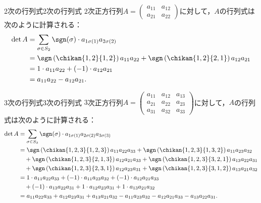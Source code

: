\begin{example}{2次の行列式}{2次の行列式}
  $2$次正方行列$A = \begin{pmatrix} a_{11} & a_{12} \\ a_{21} & a_{22} \end{pmatrix}$に対して，$A$の行列式は次のように計算される：
  \begin{align*}
    \det A &= \sum_{\sigma \in S_2} \sgn(\sigma) \cdot a_{1\sigma(1)} a_{2\sigma(2)} \\
    &= \sgn\left( \chikan{1, 2}{1, 2} \right) a_{11} a_{22} + \sgn\left( \chikan{1, 2}{2, 1} \right) a_{12} a_{21} \\
    &= 1 \cdot a_{11} a_{22} + (-1) \cdot a_{12} a_{21} \\
    &= a_{11} a_{22} - a_{12} a_{21}.
  \end{align*}
\end{example}

\begin{example}{3次の行列式}{3次の行列式}
  $3$次正方行列$A = \begin{pmatrix} a_{11} & a_{12} & a_{13} \\ a_{21} & a_{22} & a_{23} \\ a_{31} & a_{32} & a_{33} \end{pmatrix}$に対して，$A$の行列式は次のように計算される：
  \begin{align*}
    \det A &= \sum_{\sigma \in S_3} \sgn(\sigma) \cdot  a_{1\sigma(1)} a_{2\sigma(2)} a_{3\sigma(3)} \\
    &= \sgn\left( \chikan{1, 2, 3}{1, 2, 3} \right) a_{11} a_{22} a_{33} + \sgn\left( \chikan{1, 2, 3}{1, 3, 2} \right) a_{11} a_{23} a_{32} \\
    &\quad + \sgn\left( \chikan{1, 2, 3}{2, 1, 3} \right) a_{12} a_{21} a_{33} + \sgn\left( \chikan{1, 2, 3}{3, 2, 1} \right) a_{13} a_{22} a_{31} \\
    &\quad + \sgn\left( \chikan{1, 2, 3}{2, 3, 1} \right) a_{12} a_{23} a_{31} + \sgn\left( \chikan{1, 2, 3}{3, 1, 2} \right) a_{13} a_{21} a_{32} \\
    &= 1 \cdot a_{11} a_{22} a_{33} + (-1) \cdot a_{11} a_{23} a_{32} + (-1) \cdot a_{12} a_{21} a_{33} \\
    &\quad + (-1) \cdot a_{13} a_{22} a_{31} + 1 \cdot a_{12} a_{23} a_{31} + 1 \cdot a_{13} a_{21} a_{32} \\
    &= a_{11} a_{22} a_{33} + a_{12} a_{23} a_{31} + a_{13} a_{21} a_{32} - a_{11} a_{23} a_{32} - a_{12} a_{21} a_{33} - a_{13} a_{22} a_{31}.
  \end{align*}
\end{example}

